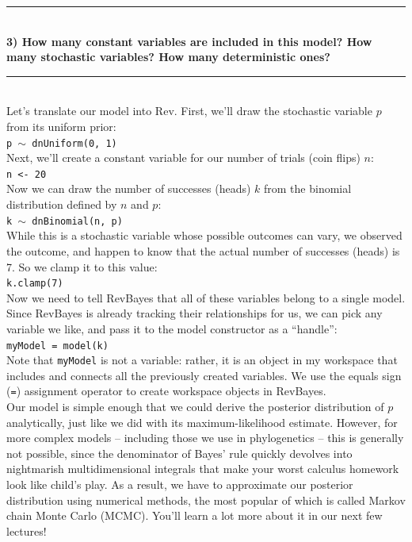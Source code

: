 \documentclass[12pt]{article}
\begin{document}
\hrule
\ \\[1ex]
\textbf{3) How many constant variables are included in this model? How many stochastic variables? How many deterministic ones?} \\
\hrule
\ \\[1ex]
\noindent Let's translate our model into Rev. First, we'll draw the stochastic variable $p$ from its uniform prior: \\

\indent \texttt{p {\footnotesize $\sim$} dnUniform(0, 1)} \\

\noindent Next, we'll create a constant variable for our number of trials (coin flips) $n$: \\

\indent \texttt{n <- 20} \\

\noindent Now we can draw the number of successes (heads) $k$ from the binomial distribution defined by $n$ and $p$: \\

\indent \texttt{k {\footnotesize $\sim$} dnBinomial(n, p)} \\

\noindent While this is a stochastic variable whose possible outcomes can vary, we observed the outcome, and happen to know that the actual number of successes (heads) is 7. So we clamp it to this value: \\

\indent \texttt{k.clamp(7)} \\

\noindent Now we need to tell RevBayes that all of these variables belong to a single model. Since RevBayes is already tracking their relationships for us, we can pick any variable we like, and pass it to the model constructor as a ``handle'': \\

\indent \texttt{myModel = model(k)} \\

\noindent Note that \texttt{myModel} is not a variable: rather, it is an object in my workspace that includes and connects all the previously created variables. We use the equals sign (\texttt{=}) assignment operator to create workspace objects in RevBayes. \\

\noindent Our model is simple enough that we could derive the posterior distribution of $p$ analytically, just like we did with its maximum-likelihood estimate. However, for more complex models -- including those we use in phylogenetics -- this is generally not possible, since the denominator of Bayes' rule quickly devolves into nightmarish multidimensional integrals that make your worst calculus homework look like child's play. As a result, we have to approximate our posterior distribution using numerical methods, the most popular of which is called Markov chain Monte Carlo (MCMC). You'll learn a lot more about it in our next few lectures! \\
\end{document}
